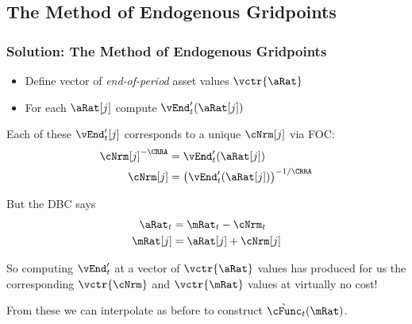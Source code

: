\documentclass{beamer}
\begin{document}
\subsection{The Method of Endogenous Gridpoints}
\begin{frame}
\frametitle{Solution: The Method of Endogenous Gridpoints}

\pause 

\begin{itemize}
\item Define vector of {\it end-of-period} asset values $\vctr{\aRat}$
\item For each $\aRat[j]$ compute $\vEnd_{t}^{\prime}(\aRat[j])$
\end{itemize}

\pause 

Each of these $\vEnd_{t}^{\prime}[j]$ corresponds to a unique
$\cNrm[j]$ via FOC:
\begin{equation}\begin{gathered}\begin{aligned}
  \cNrm[j]^{-\CRRA}  & = \vEnd_{t}^{\prime}(\aRat[j])
\\ \cNrm[j]  & = \left(\vEnd_{t}^{\prime}(\aRat[j])\right)^{-1/\CRRA}
\end{aligned}\end{gathered}\end{equation}

\pause 

But the DBC says
\begin{equation}\begin{gathered}\begin{aligned}
  \aRat_{t}  & = \mRat_{t} - \cNrm_{t}
\\ \mRat[j]  & = \aRat[j]+\cNrm[j]
\end{aligned}\end{gathered}\end{equation}

\pause 
So computing $\vEnd_{t}^{\prime}$ at a vector of $\vctr{\aRat}$ values has produced for us the corresponding $\vctr{\cNrm}$ and $\vctr{\mRat}$ 
values at virtually no cost!  

\pause 
\medskip 
From these we can interpolate as before to construct $\grave{\cFunc}_{t}(\mRat)$.

\end{frame}
\end{document}
